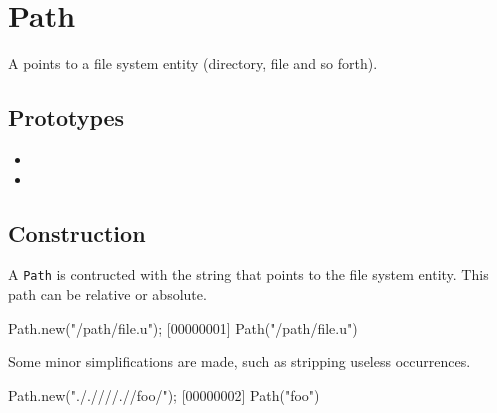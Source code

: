 \section{Path}

A  points to a file system entity (directory, file and so
forth).

\subsection{Prototypes}
\begin{itemize}
\item {}
\item {}
\end{itemize}

\subsection{Construction}

A \lstinline|Path| is contructed with the string that points to the
file system entity. This path can be relative or absolute.

\begin{urbiscript}
Path.new("/path/file.u");
[00000001] Path("/path/file.u")
\end{urbiscript}

Some minor simplifications are made, such as stripping useless
 occurrences.

\begin{urbiscript}[firstnumber=last]
Path.new("././///.//foo/");
[00000002] Path("foo")
\end{urbiscript}

